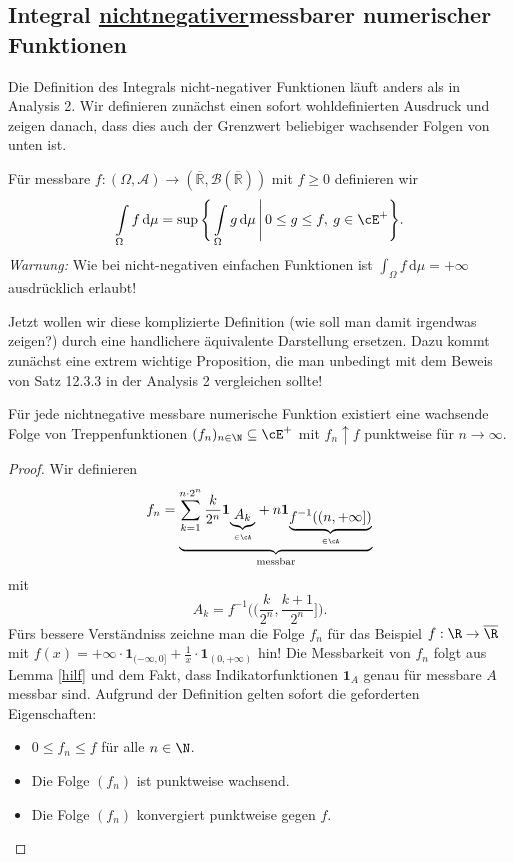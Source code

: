 \subsection{Integral \underline{nichtnegativer}\platz messbarer numerischer Funktionen}
Die Definition des Integrals nicht-negativer Funktionen l\"auft anders als in Analysis 2. Wir definieren zun\"achst einen sofort wohldefinierten Ausdruck und zeigen danach, dass dies auch der Grenzwert beliebiger wachsender Folgen von unten ist.
\begin{deff}
	Für messbare $f \! :( \Omega, \mathcal A) \rightarrow (\overline{\mathbb R}, \mathcal B(\overline{\mathbb R}))$ mit $f\geq 0$ definieren wir
	\[ \int\limits_{\Omega} f\, \mathrm{d}\mu = \sup \Bigg\{ \int\limits_{\Omega} g \,\mathrm{d}\mu \, \Bigg| \, 0\leq g \leq f, \: g \in \cE^+ \Bigg\}. \]
	\textit{Warnung:} Wie bei nicht-negativen einfachen Funktionen ist $\int_{\Omega} f\, \mathrm{d}\mu = +\infty$ ausdr\"ucklich erlaubt!
\end{deff}
Jetzt wollen wir diese komplizierte Definition (wie soll man damit irgendwas zeigen?) durch eine handlichere \"aquivalente Darstellung ersetzen. Dazu kommt zun\"achst eine extrem wichtige Proposition, die man unbedingt mit dem Beweis von Satz 12.3.3 in der Analysis 2 vergleichen sollte!
\begin{prop}\label{k}
	Für jede nichtnegative messbare numerische Funktion existiert eine wachsende Folge von Treppenfunktionen $(f_n)_{n \in \N} \subseteq \cE^+$ mit $f_n \uparrow f$ punktweise f\"ur $n \to \infty$.
\end{prop}

\begin{proof}
	Wir definieren \[ f_n = \underbrace{\sum\limits_{k = 1}^{n\cdot 2^n} \frac{k}{2^n} \mathbf{1}_{\underbrace{A_k}_{\in \cA}} + n \mathbf{1}_{\underbrace{f^{-1}((n,+\infty])}_{\in \cA}}}_{\text{messbar}} \]
	mit 
	\[ A_k = f^{-1} \Big(\Big(\frac{k}{2^n}, \frac{k + 1}{2^n}\Big]\Big). \]
	F\"urs bessere Verst\"andniss zeichne man die Folge $f_n$ f\"ur das Beispiel $f:\R\to\overline \R$ mit $f(x)=+\infty\cdot \textbf{1}_{(-\infty,0]}+\frac{1}{x}\cdot\mathbf{1}_{(0,+\infty)}$ hin!
	Die Messbarkeit von $f_n$ folgt aus Lemma \ref{hilf} und dem Fakt, dass Indikatorfunktionen $\mathbf{1}_A$ genau f\"ur messbare $A$ messbar sind. Aufgrund der Definition gelten sofort die geforderten Eigenschaften:
	\begin{itemize}
		\item $0\leq f_n \leq f$ f\"ur alle $n\in\N$.
		\item Die Folge $(f_n)$ ist punktweise wachsend.
		\item Die Folge $(f_n)$ konvergiert punktweise gegen $f$.
	\end{itemize}
\end{proof}